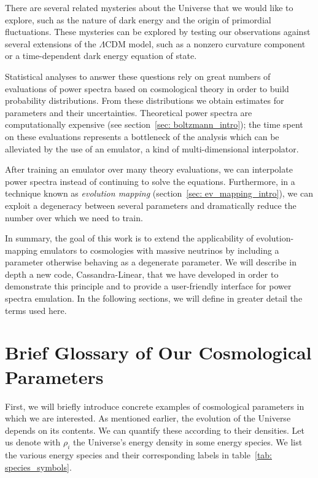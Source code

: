 There are several related mysteries about the Universe that we would like to
explore, such as the nature of dark energy and the origin of primordial
fluctuations. These mysteries can be explored by testing our observations
against several extensions of the $\Lambda$CDM model, such as a nonzero 
curvature component or a time-dependent dark energy equation of state. 

Statistical analyses to answer these questions rely on great numbers of
evaluations of power spectra based on cosmological theory in order to build 
probability 
distributions. From these distributions we obtain estimates for parameters and 
their
uncertainties. Theoretical power spectra are computationally expensive 
(see section~\ref{sec: boltzmann_intro}); the time spent on these evaluations
represents a bottleneck of the analysis which can be alleviated by the
use of an emulator, a kind of multi-dimensional interpolator.

After training an emulator over many theory evaluations, we can interpolate
power spectra instead of continuing to solve the equations. Furthermore, in
a technique known as \textit{evolution mapping}
(section~\ref{sec: ev_mapping_intro}), we can exploit a degeneracy between 
several parameters and dramatically reduce the number over which
we need to train. 

In summary, the goal of this work is to extend the applicability of
evolution-mapping emulators to cosmologies with massive neutrinos by
including a parameter otherwise behaving as a degenerate parameter. We
will describe in depth a new code, Cassandra-Linear, that we have developed
in order to demonstrate this principle and to provide a user-friendly
interface for power spectra emulation. In the
following sections, we will define in greater detail the terms used here.

\section{Brief Glossary of Our Cosmological Parameters}
\label{sec: param_glossary}


First, we will briefly introduce concrete
examples of cosmological parameters in which we are interested. As mentioned earlier, the evolution of the Universe depends on its contents.
We can quantify these according to their densities. Let us denote with
$\rho_i$ the Universe's energy density in some energy species. We list the 
various energy species and their corresponding labels in
table~\ref{tab: species_symbols}.

